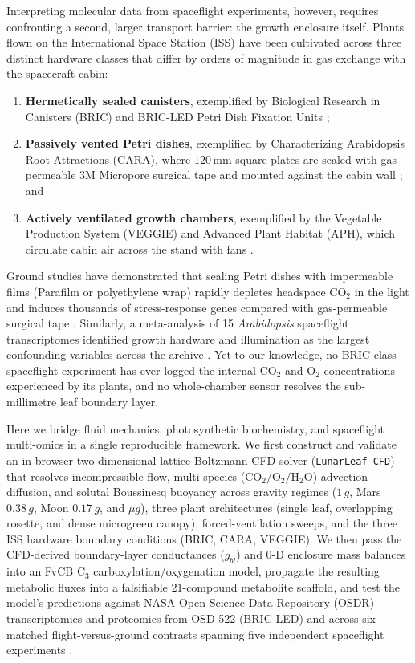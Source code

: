 \documentclass[preprint,11pt,numbers,sort&compress]{elsarticle}
\begin{document}
Interpreting molecular data from spaceflight experiments, however, requires confronting a second, larger transport barrier: the growth enclosure itself. Plants flown on the International Space Station (ISS) have been cultivated across three distinct hardware classes that differ by orders of magnitude in gas exchange with the spacecraft cabin:
\begin{enumerate}
    \item \textbf{Hermetically sealed canisters}, exemplified by Biological Research in Canisters (BRIC) and BRIC-LED Petri Dish Fixation Units \citep{correll2013,osd522};
    \item \textbf{Passively vented Petri dishes}, exemplified by Characterizing Arabidopsis Root Attractions (CARA), where $120\,\mathrm{mm}$ square plates are sealed with gas-permeable $3\mathrm{M}$ Micropore surgical tape and mounted against the cabin wall \citep{cara,osd678}; and
    \item \textbf{Actively ventilated growth chambers}, exemplified by the Vegetable Production System (VEGGIE) and Advanced Plant Habitat (APH), which circulate cabin air across the stand with fans \citep{osd427}.
\end{enumerate}
Ground studies have demonstrated that sealing Petri dishes with impermeable films (Parafilm or polyethylene wrap) rapidly depletes headspace $\mathrm{CO_2}$ in the light and induces thousands of stress-response genes compared with gas-permeable surgical tape \citep{parafilm,sealingfilm}. Similarly, a meta-analysis of 15 \textit{Arabidopsis} spaceflight transcriptomes identified growth hardware and illumination as the largest confounding variables across the archive \citep{barker2023}. Yet to our knowledge, no BRIC-class spaceflight experiment has ever logged the internal $\mathrm{CO_2}$ and $\mathrm{O_2}$ concentrations experienced by its plants, and no whole-chamber sensor resolves the sub-millimetre leaf boundary layer.

Here we bridge fluid mechanics, photosynthetic biochemistry, and spaceflight multi-omics in a single reproducible framework. We first construct and validate an in-browser two-dimensional lattice-Boltzmann CFD solver (\texttt{LunarLeaf-CFD}) that resolves incompressible flow, multi-species ($\mathrm{CO_2/O_2/H_2O}$) advection--diffusion, and solutal Boussinesq buoyancy across gravity regimes ($1\,g$, Mars $0.38\,g$, Moon $0.17\,g$, and $\mu g$), three plant architectures (single leaf, overlapping rosette, and dense microgreen canopy), forced-ventilation sweeps, and the three ISS hardware boundary conditions (BRIC, CARA, VEGGIE). We then pass the CFD-derived boundary-layer conductances ($g_{bl}$) and 0-D enclosure mass balances into an FvCB $\mathrm{C_3}$ carboxylation/oxygenation model, propagate the resulting metabolic fluxes into a falsifiable 21-compound metabolite scaffold, and test the model's predictions against NASA Open Science Data Repository (OSDR) transcriptomics and proteomics from OSD-522 (BRIC-LED) \citep{osd522} and across six matched flight-versus-ground contrasts spanning five independent spaceflight experiments \citep{osd522,osd38,osd321,osd678,osd427}.
\end{document}
